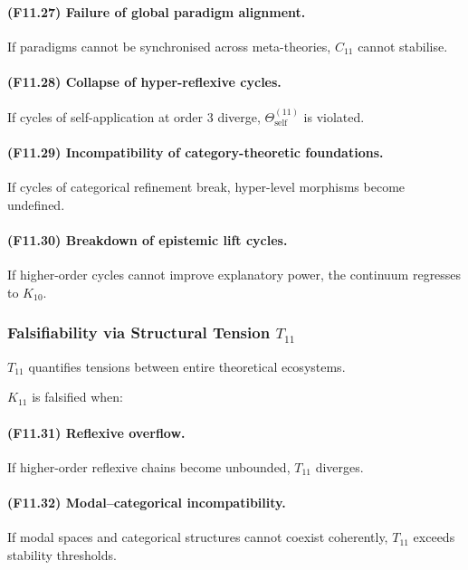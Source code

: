 \paragraph{(F11.27) Failure of global paradigm alignment.}
If paradigms cannot be synchronised across meta-theories,
$C_{11}$ cannot stabilise.

\paragraph{(F11.28) Collapse of hyper-reflexive cycles.}
If cycles of self-application at order 3 diverge,
$\Theta_{\mathrm{self}}^{(11)}$ is violated.

\paragraph{(F11.29) Incompatibility of category-theoretic foundations.}
If cycles of categorical refinement break,
hyper-level morphisms become undefined.

\paragraph{(F11.30) Breakdown of epistemic lift cycles.}
If higher-order cycles cannot improve explanatory power,
the continuum regresses to $K_{10}$.



\subsubsection{Falsifiability via Structural Tension $T_{11}$}

$T_{11}$ quantifies tensions between entire theoretical ecosystems.

$K_{11}$ is falsified when:

\paragraph{(F11.31) Reflexive overflow.}
If higher-order reflexive chains become unbounded,
$T_{11}$ diverges.

\paragraph{(F11.32) Modal–categorical incompatibility.}
If modal spaces and categorical structures cannot coexist coherently,
$T_{11}$ exceeds stability thresholds.

